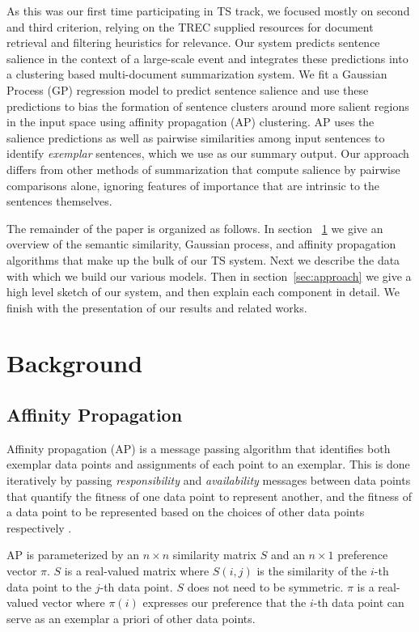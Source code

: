 \documentclass{sig-alternate}
\begin{document}
As this was our first time participating in TS track, we focused mostly on 
second and third criterion, relying on the TREC supplied resources for 
document retrieval and filtering heuristics for relevance.
Our system predicts sentence salience in the context of a
large-scale event and integrates these predictions into
a clustering based multi-document summarization system. We fit a Gaussian 
Process (GP) regression model to predict sentence salience and use 
these predictions to bias the
formation of sentence clusters around more salient regions in the input space
using affinity propagation (AP) clustering.  AP uses the salience predictions
as well as pairwise similarities among input sentences to identify
\emph{exemplar} sentences, which we use as our summary output.  Our approach
differs from other methods of summarization that compute salience by pairwise
comparisons alone, ignoring features of importance that are intrinsic to the
sentences themselves.

The remainder of the paper is organized as follows. In section
~\ref{sec:background} we give an overview of the semantic similarity, 
Gaussian process, and affinity propagation algorithms that make up the bulk of
our TS system. 
Next we describe the data with which we build our various models.
Then in section~\ref{sec:approach} we give a high level sketch
of our system, and then explain each component in detail. 
We finish with the presentation of our results and related works.


\section{Background}\label{sec:background}

\subsection{Affinity Propagation}

Affinity propagation (AP) is a message passing algorithm that identifies both
exemplar data points and assignments of each point to an exemplar.  This is
done iteratively by passing \emph{responsibility} and \emph{availability}
messages between data points that quantify the fitness of one data point to
represent another, and the fitness of a data point to be represented based on
the choices of other data points respectively \cite{dueck2007non}.

AP is parameterized by an $n\times n$ similarity matrix $S$ and an $n\times 1$
preference vector $\pi$.  $S$ is a real-valued matrix where $S(i,j)$ is the
similarity of the $i$-th data point to the $j$-th data point.  $S$ does not
need to be symmetric.  $\pi$ is a real-valued vector where $\pi(i)$ expresses
our preference that the $i$-th data point can serve as an exemplar a priori of
other data points. 
\end{document}
